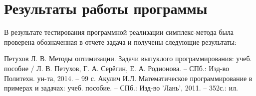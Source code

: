 \documentclass{article}
\begin{document}
\section{Результаты работы программы}
\label{res}
\noindent В результате тестирования программной реализации симплекс-метода была проверена обозначенная в отчете задача и получены следующие результаты:

\begin{figure}[H]
\label{fig:image}
\end{figure}

\begin{figure}[H]
\label{fig:image}
\end{figure}

	\begin{thebibliography}{99}
		 Петухов Л. В. Методы оптимизации. Задачи выпуклого программирования: учеб. пособие / Л. В. Петухов, Г. А. Серёгин, Е. А. Родионова. -- СПб.: Изд-во Политехн. ун-та, 2014. -- 99 с.
		 Акулич И.Л. Математическое программирование в примерах и задачах: учеб. пособие. -- СПб.: Изд-во 'Лань', 2011. -- 352с.: ил.
	\end{thebibliography}
	
\end{document}
